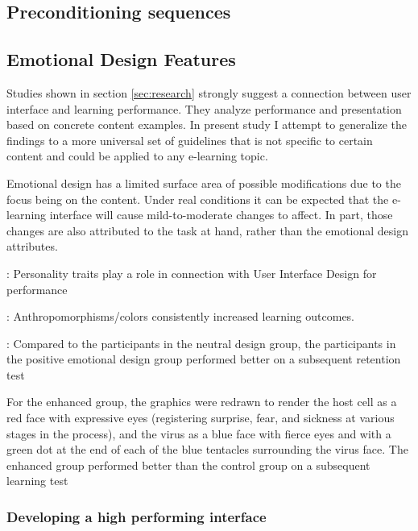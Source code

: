	\subsection{Preconditioning sequences} \label{sec:preconditioning}
	
	
	
	\subsection{Emotional Design Features} \label{sec:emotional-design-features}

	Studies shown in section \ref{sec:research} strongly suggest a connection between user interface and learning performance. They analyze performance and presentation based on concrete content examples. In present study I attempt to generalize the findings to a more universal set of guidelines that is not specific to certain content and could be applied to any e-learning topic.
	
	Emotional design has a limited surface area of possible modifications due to the focus being on the content. Under real conditions it can be expected that the e-learning interface will cause mild-to-moderate changes to affect. In part, those changes are also attributed to the task at hand, rather than the emotional design attributes.

	
	\cite{Arockiam2013}: Personality traits play a role in connection with User Interface Design for performance
	
	\cite{Brom2018}: Anthropomorphisms/colors consistently increased learning outcomes.
	
	\cite{Le2018}: Compared to the participants in the neutral design group, the participants in the positive emotional design group performed better on a subsequent retention test
	
	\cite{Mayer2014} For the enhanced group, the graphics were redrawn to render the host cell as a red face with expressive eyes (registering surprise, fear, and sickness at various stages in the process), and the virus as a blue face with fierce eyes and with a green dot at the end of each of the blue tentacles surrounding the virus face. The enhanced group performed better than the control group on a subsequent learning test
	

	
	
	\subsubsection{Developing a high performing interface}
	
